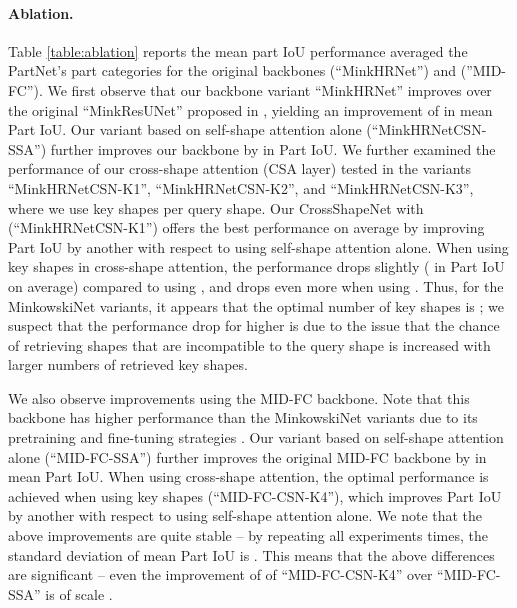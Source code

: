\documentclass{egpubl}
\begin{document}
\paragraph*{Ablation.} Table \ref{table:ablation} reports the mean part IoU performance averaged the PartNet's part categories for the original backbones (``MinkHRNet'') and (''MID-FC''). We first observe that our backbone variant ``MinkHRNet'' improves over the original ``MinkResUNet'' proposed in \cite{Choy:2019}, yielding an improvement of  in mean Part IoU. Our variant based on self-shape attention alone (``MinkHRNetCSN-SSA'') further improves our backbone by   in  Part IoU. We further examined the performance of our cross-shape attention (CSA layer) tested in the variants ``MinkHRNetCSN-K1'', ``MinkHRNetCSN-K2'', and ``MinkHRNetCSN-K3'', where we use \mbox{} key shapes per query shape. Our CrossShapeNet with 
(``MinkHRNetCSN-K1'') offers the best performance on average by improving Part IoU by another  with respect to using self-shape attention alone. When using  key shapes in cross-shape attention, the performance drops slightly ( in Part IoU on average) compared to using , and drops even more when using . Thus, for the MinkowskiNet variants, it appears that the optimal number of key shapes is ; we suspect that the performance drop for higher  is due to the issue that the chance of retrieving shapes that are incompatible to the query shape is increased with larger numbers of retrieved key shapes.

We also observe improvements using the MID-FC backbone. Note that this backbone has higher performance than the MinkowskiNet variants due to its pretraining and fine-tuning strategies \cite{Wang:2021}. Our variant based on self-shape attention alone (``MID-FC-SSA'') further improves the original MID-FC backbone by   in mean Part IoU.  When using cross-shape attention, the optimal performance is achieved when using  key shapes (``MID-FC-CSN-K4''), which improves 
Part IoU by another  with respect to using self-shape attention alone. 
We note that the above improvements are quite stable -- by repeating all experiments  times, the standard deviation of mean Part IoU is . This means that the above differences are  significant -- even the improvement of  of ``MID-FC-CSN-K4'' over ``MID-FC-SSA'' is of scale . 

\vspace{-2.25mm} 
\end{document}
